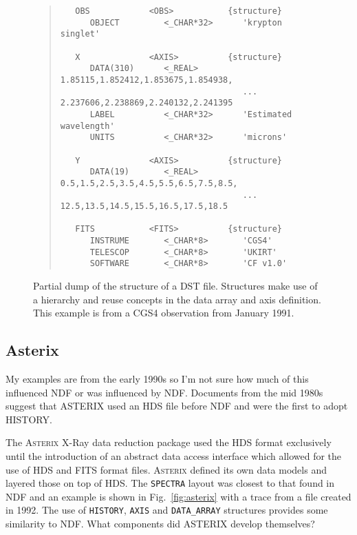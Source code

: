 \documentclass[final,authoryear,5p,times,twocolumn]{elsarticle}
\begin{document}
{\begin{figure*}[t]
\begin{minipage}{\textwidth}
\begin{quote}
\begin{verbatim}
   OBS            <OBS>           {structure}
      OBJECT         <_CHAR*32>      'krypton singlet'

   X              <AXIS>          {structure}
      DATA(310)      <_REAL>         1.85115,1.852412,1.853675,1.854938,
                                     ... 2.237606,2.238869,2.240132,2.241395
      LABEL          <_CHAR*32>      'Estimated wavelength'
      UNITS          <_CHAR*32>      'microns'

   Y              <AXIS>          {structure}
      DATA(19)       <_REAL>         0.5,1.5,2.5,3.5,4.5,5.5,6.5,7.5,8.5,
                                     ... 12.5,13.5,14.5,15.5,16.5,17.5,18.5

   FITS           <FITS>          {structure}
      INSTRUME       <_CHAR*8>       'CGS4'
      TELESCOP       <_CHAR*8>       'UKIRT'
      SOFTWARE       <_CHAR*8>       'CF v1.0'
\end{verbatim}
\end{quote}
\caption{Partial dump of the structure of a DST file. Structures make
  use of a hierarchy and reuse concepts in the data array and axis
  definition. This example is from a CGS4 observation from January
  1991.}
\label{fig:dst}
\end{minipage}
\end{figure*}

\subsection{Asterix}

{\color{red} My examples are from the early 1990s so I'm not sure how
  much of this influenced NDF or was influenced by NDF. Documents from
  the mid 1980s suggest that ASTERIX used an HDS file before NDF and
  were the first to adopt HISTORY.}

The \textsc{Asterix} X-Ray data reduction package \citep{SUN98,1992STARB...9....3S} used the HDS
format exclusively until the introduction of an abstract data access
interface \citep{1995ASPC...77..199A} which allowed for the use of HDS
and FITS format files. \textsc{Asterix} defined its
own data models and layered those on top of HDS. The \texttt{SPECTRA}
layout was closest to that found in NDF and an example is shown in
Fig.\ \ref{fig:asterix} with a trace from a file created in 1992. The
use of \texttt{HISTORY}, \texttt{AXIS} and \texttt{DATA\_ARRAY}
structures provides some similarity to NDF. {\color{red} What
  components did ASTERIX develop themselves?}

}
\end{document}

